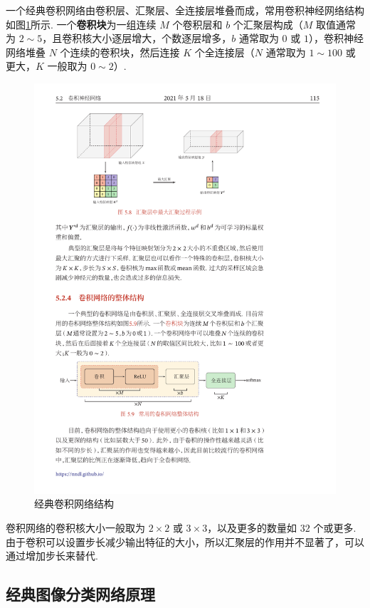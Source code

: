 \documentclass[12pt, a4paper, oneside]{ctexart}
\numberwithin{equation}{section}  %
\begin{document}
一个经典卷积网络由卷积层、汇聚层、全连接层堆叠而成，常用卷积神经网络结构如图\ref{fig-classicCNN}所示.
一个\textbf{卷积块}为一组连续 \(M\) 个卷积层和 \(b\) 个汇聚层构成（\(M\)
取值通常为 \(2\sim 5\)，且卷积核大小逐层增大，个数逐层增多，\(b\)
通常取为 \(0\) 或 \(1\)），卷积神经网络堆叠 \(N\)
个连续的卷积块，然后连接 \(K\) 个全连接层（\(N\) 通常取为 \(1\sim 100\)
或更大，\(K\) 一般取为 \(0\sim 2\)）.
\begin{figure}[htbp]
    \centering
    \includegraphics[scale=1.4]{经典卷积网络结构.pdf}
    \caption{经典卷积网络结构}
    \label{fig-classicCNN}
\end{figure}

卷积网络的卷积核大小一般取为 \(2\times 2\) 或
\(3\times 3\)，以及更多的数量如 \(32\) 个或更多.
由于卷积可以设置步长减少输出特征的大小，所以汇聚层的作用并不显著了，可以通过增加步长来替代.

\subsection{经典图像分类网络原理}
\end{document}
